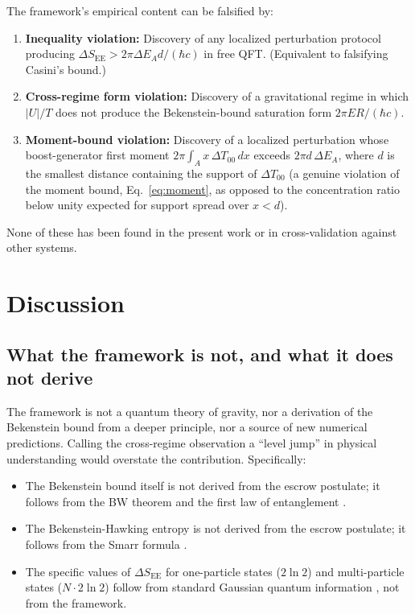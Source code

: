 \documentclass[11pt]{article}
\begin{document}
The framework's empirical content can be falsified by:

\begin{enumerate}
\item \textbf{Inequality violation:} Discovery of any localized perturbation protocol producing $\Delta S_{\mathrm{EE}} > 2\pi \Delta E_A d/(\hbar c)$ in free QFT. (Equivalent to falsifying Casini's bound.)
\item \textbf{Cross-regime form violation:} Discovery of a gravitational regime in which $|U|/T$ does not produce the Bekenstein-bound saturation form $2\pi E R/(\hbar c)$.
\item \textbf{Moment-bound violation:} Discovery of a localized perturbation whose boost-generator first moment $2\pi \int_A x\, \Delta T_{00}\, dx$ exceeds $2\pi d\, \Delta E_A$, where $d$ is the smallest distance containing the support of $\Delta T_{00}$ (a genuine violation of the moment bound, Eq.~\ref{eq:moment}, as opposed to the concentration ratio below unity expected for support spread over $x < d$).
\end{enumerate}

None of these has been found in the present work or in cross-validation against other systems.

\section{Discussion}

\subsection{What the framework is not, and what it does not derive}

The framework is not a quantum theory of gravity, nor a derivation of the Bekenstein bound from a deeper principle, nor a source of new numerical predictions. Calling the cross-regime observation a ``level jump'' in physical understanding would overstate the contribution. Specifically:

\begin{itemize}
\item The Bekenstein bound itself is not derived from the escrow postulate; it follows from the BW theorem and the first law of entanglement \cite{Casini2008}.
\item The Bekenstein-Hawking entropy is not derived from the escrow postulate; it follows from the Smarr formula \cite{Smarr1973}.
\item The specific values of $\Delta S_{\mathrm{EE}}$ for one-particle states ($2\ln 2$) and multi-particle states ($N \cdot 2\ln 2$) follow from standard Gaussian quantum information \cite{AdessoIlluminati2007, HolevoSohma1999}, not from the framework.
\end{itemize}
\end{document}
